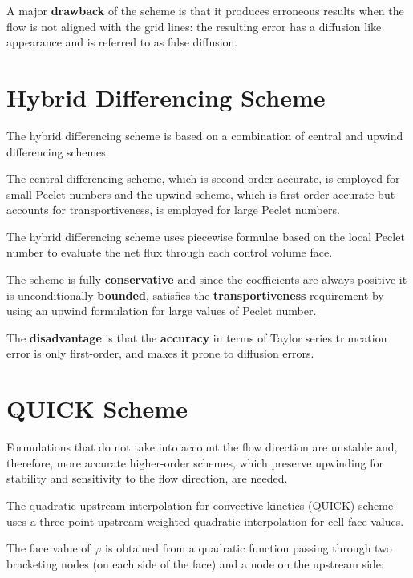 \documentclass[a4paper, 15pt]{article}
\begin{document}
A
major \textbf{drawback} of the scheme is that it produces erroneous results when the flow is not
aligned with the grid lines: the
resulting error has a diffusion like appearance and is referred to as false diffusion.

\section{Hybrid Differencing Scheme}


The hybrid differencing scheme is based on a combination of central and
upwind differencing schemes.\newline

The central differencing scheme, which is second-order accurate, is employed for small Peclet
numbers and the upwind scheme, which is first-order accurate but accounts for
transportiveness, is employed for large Peclet numbers.

The hybrid differencing scheme uses piecewise formulae based on the local Peclet number to
evaluate the net flux through each control volume face. \newline 

The scheme is fully \textbf{conservative} and since the coefficients are always positive it is
unconditionally \textbf{bounded}, satisfies the \textbf{transportiveness} requirement by using an upwind formulation for large values of
Peclet number. \newline 

The \textbf{disadvantage} is that the \textbf{accuracy} in terms of Taylor series truncation error is only first-order, and makes it prone to 
diffusion errors.

\section{QUICK Scheme}

Formulations that do not take into account the flow direction are unstable and, therefore, more
accurate higher-order schemes, which preserve upwinding for stability and sensitivity to the flow
direction, are needed. \newline 

The quadratic upstream interpolation for convective kinetics (QUICK) scheme
uses a three-point upstream-weighted quadratic interpolation for cell face values. \newline

The face value of $\varphi$ is obtained from a quadratic function passing through two bracketing nodes
(on each side of the face) and a node on the upstream side:
\end{document}
